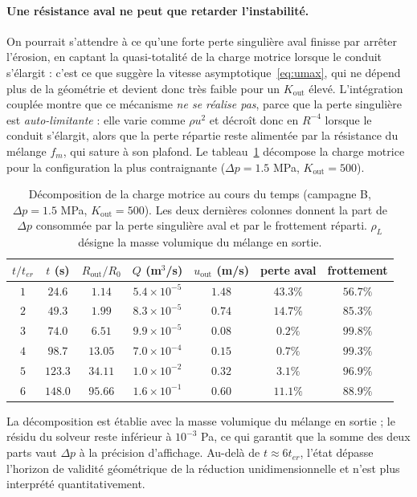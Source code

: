 \documentclass[11pt,a4paper]{report}
\newcommand{\kout}{K_{\mathrm{out}}}
\newcommand{\ter}{{t_{er}}}
\begin{document}
\paragraph{Une résistance aval ne peut que retarder l'instabilité.}
On pourrait s'attendre à ce qu'une forte perte singulière aval finisse par arrêter l'érosion, en captant la
quasi-totalité de la charge motrice lorsque le conduit s'élargit : c'est ce que suggère la vitesse
asymptotique~\eqref{eq:umax}, qui ne dépend plus de la géométrie et devient donc très faible pour un
\(\kout\) élevé. L'intégration couplée montre que ce mécanisme \emph{ne se réalise pas}, parce que la
perte singulière est \emph{auto-limitante} : elle varie comme \(\rho u^2\) et décroît donc en \(R^{-4}\)
lorsque le conduit s'élargit, alors que la perte répartie reste alimentée par la résistance du mélange
\(f_m\), qui sature à son plafond. Le tableau~\ref{tab:bilan-charge} décompose la charge motrice pour la
configuration la plus contraignante (\(\Delta p = 1.5\) MPa, \(\kout = 500\)).

\begin{table}[H]
\centering
\caption{Décomposition de la charge motrice au cours du temps (campagne B, \(\Delta p = 1.5\) MPa,
\(\kout = 500\)). Les deux dernières colonnes donnent la part de \(\Delta p\) consommée par la perte
singulière aval et par le frottement réparti. \(\rho_L\) désigne la masse volumique du mélange en sortie.}
\label{tab:bilan-charge}
\small
\begin{tabular}{ccccccc}
\toprule
\(t/\ter\) & \(t\) (s) & \(R_{\mathrm{out}}/R_0\) & \(Q\) (m\(^3\)/s) & \(u_{\mathrm{out}}\) (m/s)
& perte aval & frottement \\
\midrule
\(1\) & \(24.6\) & \(1.14\) & \(5.4\times10^{-5}\) & \(1.48\) & \(43.3\%\) & \(56.7\%\) \\
\(2\) & \(49.3\) & \(1.99\) & \(8.3\times10^{-5}\) & \(0.74\) & \(14.7\%\) & \(85.3\%\) \\
\(3\) & \(74.0\) & \(6.51\) & \(9.9\times10^{-5}\) & \(0.08\) & \(0.2\%\) & \(99.8\%\) \\
\(4\) & \(98.7\) & \(13.05\) & \(7.0\times10^{-4}\) & \(0.15\) & \(0.7\%\) & \(99.3\%\) \\
\(5\) & \(123.3\) & \(34.11\) & \(1.0\times10^{-2}\) & \(0.32\) & \(3.1\%\) & \(96.9\%\) \\
\(6\) & \(148.0\) & \(95.66\) & \(1.6\times10^{-1}\) & \(0.60\) & \(11.1\%\) & \(88.9\%\) \\
\bottomrule
\end{tabular}
\begin{tablenotes}
\small
\item La décomposition est établie avec la masse volumique du mélange en sortie ; le résidu du solveur
reste inférieur à \(10^{-3}\) Pa, ce qui garantit que la somme des deux parts vaut \(\Delta p\) à la
précision d'affichage. Au-delà de \(t \approx 6\ter\), l'état dépasse l'horizon de validité géométrique de
la réduction unidimensionnelle et n'est plus interprété quantitativement.
\end{tablenotes}
\end{table}
\end{document}
